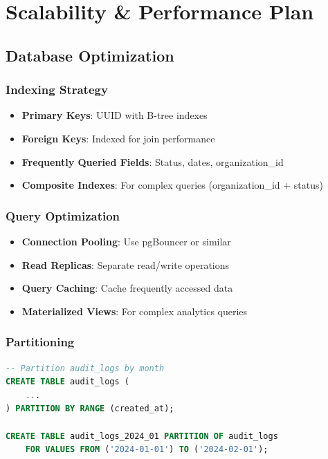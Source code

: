 \documentclass[11pt,a4paper]{article}
\begin{document}
\section{Scalability \& Performance Plan}

\subsection{Database Optimization}

\subsubsection{Indexing Strategy}
\begin{itemize}
    \item \textbf{Primary Keys}: UUID with B-tree indexes
    \item \textbf{Foreign Keys}: Indexed for join performance
    \item \textbf{Frequently Queried Fields}: Status, dates, organization\_id
    \item \textbf{Composite Indexes}: For complex queries (organization\_id + status)
\end{itemize}

\subsubsection{Query Optimization}
\begin{itemize}
    \item \textbf{Connection Pooling}: Use pgBouncer or similar
    \item \textbf{Read Replicas}: Separate read/write operations
    \item \textbf{Query Caching}: Cache frequently accessed data
    \item \textbf{Materialized Views}: For complex analytics queries
\end{itemize}

\subsubsection{Partitioning}
\begin{lstlisting}[language=SQL, caption=Partition audit_logs by month]
-- Partition audit_logs by month
CREATE TABLE audit_logs (
    ...
) PARTITION BY RANGE (created_at);

CREATE TABLE audit_logs_2024_01 PARTITION OF audit_logs
    FOR VALUES FROM ('2024-01-01') TO ('2024-02-01');
\end{lstlisting}
\end{document}
